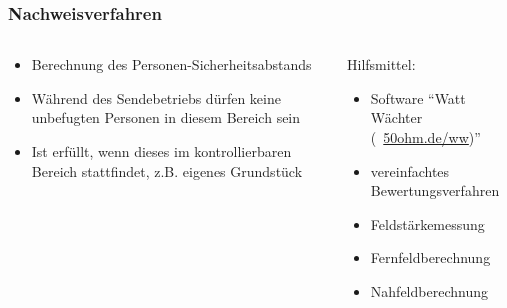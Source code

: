 \begin{frame}
\frametitle{Nachweisverfahren}
\begin{columns}
    \begin{column}{0.48\textwidth}
    \begin{itemize}
  \item Berechnung des Personen-Sicherheitsabstands
  \item Während des Sendebetriebs dürfen keine unbefugten Personen in diesem Bereich sein
  \item Ist erfüllt, wenn dieses im kontrollierbaren Bereich stattfindet, z.B. eigenes Grundstück
  \end{itemize}

    \end{column}
   \begin{column}{0.48\textwidth}
       Hilfsmittel:

\begin{itemize}
  \item Software \enquote{Watt Wächter (\textcolor{DARCblue}{\faLink~\href{https://50ohm.de/ww}{50ohm.de/ww}})}
  \item vereinfachtes Bewertungsverfahren
  \item Feldstärkemessung
  \item Fernfeldberechnung
  \item Nahfeldberechnung
  \end{itemize}

   \end{column}
\end{columns}

\end{frame}

